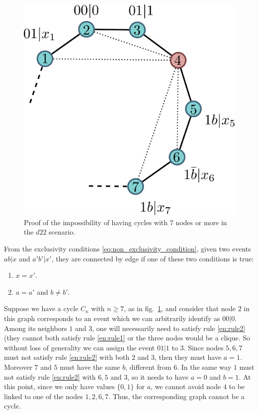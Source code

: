 \documentclass[letterpaper]{article}
\begin{document}
\begin{figure}[h]
    \centering
    \includegraphics[width=.6\columnwidth]{images/cycle_proof.pdf}
    \caption{Proof of the impossibility of having cycles with $7$ nodes or more
    in the $d22$ scenario.}
    \label{fig:cycle_graph_proof}
\end{figure}

From the exclusivity conditions \eqref{eq:non_exclusivity_condition},
given two events $ab|x$ and $a'b'|x'$, they are connected by edge if one of these two conditions is true:
\begin{enumerate}
    \item $x=x'$.\label{en:rule1}
    \item $a=a'$ and $b \neq b'$.\label{en:rule2}
\end{enumerate}
Suppose we have a cycle $C_n$ with $n \ge 7$, as in fig.~\ref{fig:cycle_graph_proof},
and consider that node $2$ in this graph corresponds to an event which we can arbitrarily identify as $00|0$.
Among its neighbors $1$ and $3$, one will necessarily need to satisfy rule
\ref{en:rule2} (they cannot both satisfy rule \ref{en:rule1} or the three nodes
would be a clique.
So without loss of generality we can assign the event $01|1$ to $3$.
Since nodes $5,6,7$ must not satisfy rule \ref{en:rule2} with both $2$ and $3$, then they must have $a = 1$.
Moreover $7$ and $5$ must have the same $b$, different from $6$. In the same way $1$ must not satisfy rule \ref{en:rule2} with $6,5$ and $3$, so it
needs to have $a=0$ and $b=1$. At this point, since we only have values
$\{0,1\}$ for $a$, we cannot avoid node $4$ to be linked to one of the nodes
$1,2,6,7$. Thus, the corresponding graph cannot be a cycle.
\end{document}
